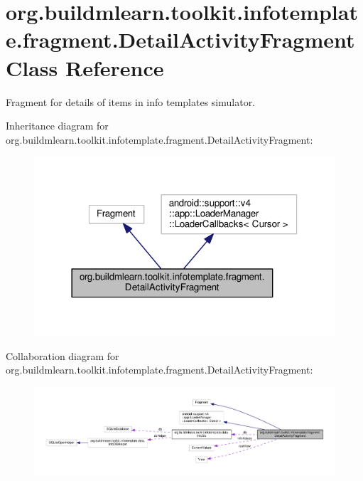 \hypertarget{classorg_1_1buildmlearn_1_1toolkit_1_1infotemplate_1_1fragment_1_1DetailActivityFragment}{}\section{org.\+buildmlearn.\+toolkit.\+infotemplate.\+fragment.\+Detail\+Activity\+Fragment Class Reference}
\label{classorg_1_1buildmlearn_1_1toolkit_1_1infotemplate_1_1fragment_1_1DetailActivityFragment}


Fragment for details of items in info template\textquotesingle{}s simulator.  




Inheritance diagram for org.\+buildmlearn.\+toolkit.\+infotemplate.\+fragment.\+Detail\+Activity\+Fragment\+:
\nopagebreak
\begin{figure}[H]
\begin{center}
\leavevmode
\includegraphics[width=318pt]{classorg_1_1buildmlearn_1_1toolkit_1_1infotemplate_1_1fragment_1_1DetailActivityFragment__inherit__graph}
\end{center}
\end{figure}


Collaboration diagram for org.\+buildmlearn.\+toolkit.\+infotemplate.\+fragment.\+Detail\+Activity\+Fragment\+:
\nopagebreak
\begin{figure}[H]
\begin{center}
\leavevmode
\includegraphics[width=350pt]{classorg_1_1buildmlearn_1_1toolkit_1_1infotemplate_1_1fragment_1_1DetailActivityFragment__coll__graph}
\end{center}
\end{figure}
